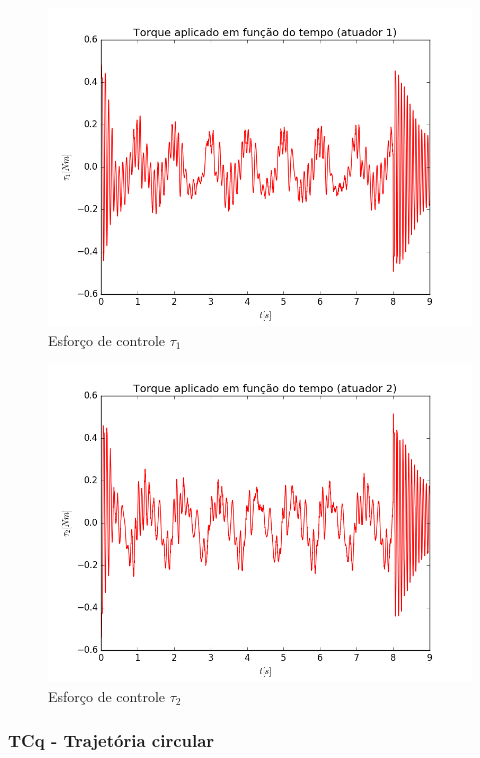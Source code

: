 \documentclass[]{politex}
\begin{document}
\begin{multicols}{2}
\begin{figure}[H]
	\centering
	\includegraphics[scale=0.39]{../../../Experimental/Aquisicoes/PIDSMCt_circulo/tau1.png}  
	\caption{Esforço de controle $\tau_1$}
	\label{fig:PIDSMCq_circulo_tau1}
\end{figure}
\begin{figure}[H]
	\centering
	\includegraphics[scale=0.39]{../../../Experimental/Aquisicoes/PIDSMCt_circulo/tau2.png}  
	\caption{Esforço de controle $\tau_2$}
	\label{fig:PIDSMCq_circulo_tau2}
\end{figure}
\end{multicols}

\subsubsection{TCq - Trajetória circular}
\end{document}
